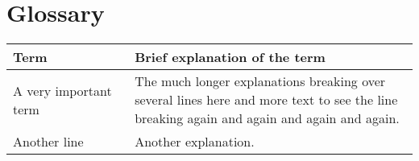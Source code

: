 \documentclass[report]{subfiles}
\begin{document}
\section{Glossary}

\renewcommand{\arraystretch}{1.5}


\begin{tabular}{|p{0.3\linewidth}|p{0.8\linewidth}}
\hline
\textbf{Term} & \textbf{Brief explanation of the term}\\
\hline
A very important term & The much longer explanations breaking over several lines here and more text to see the line breaking again and again and again and again.\\
Another line & Another explanation.\\
\end{tabular}
\end{document}
